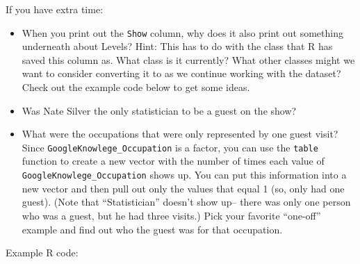 \documentclass[]{book}
\makeatletter
\newenvironment{Shaded}{\begin{snugshade}}{\end{snugshade}}
\newcommand{\KeywordTok}[1]{\textcolor[rgb]{0.13,0.29,0.53}{\textbf{{#1}}}}
\newcommand{\DataTypeTok}[1]{\textcolor[rgb]{0.13,0.29,0.53}{{#1}}}
\newcommand{\StringTok}[1]{\textcolor[rgb]{0.31,0.60,0.02}{{#1}}}
\newcommand{\CommentTok}[1]{\textcolor[rgb]{0.56,0.35,0.01}{\textit{{#1}}}}
\newcommand{\NormalTok}[1]{{#1}}
\providecommand{\tightlist}{%
  \setlength{\itemsep}{0pt}\setlength{\parskip}{0pt}}
\newenvironment{kframe}{%
\medskip{}
\setlength{\fboxsep}{.8em}
 \def\at@end@of@kframe{}%
 \ifinner\ifhmode%
  \def\at@end@of@kframe{\end{minipage}}%
  \begin{minipage}{\columnwidth}%
 \fi\fi%
 \def\FrameCommand##1{\hskip\@totalleftmargin \hskip-\fboxsep
 \colorbox{shadecolor}{##1}\hskip-\fboxsep
     \hskip-\linewidth \hskip-\@totalleftmargin \hskip\columnwidth}%
 \MakeFramed {\advance\hsize-\width
   \@totalleftmargin\z@ \linewidth\hsize
   \@setminipage}}%
 {\par\unskip\endMakeFramed%
 \at@end@of@kframe}
\renewenvironment{Shaded}{\begin{kframe}}{\end{kframe}}
\makeatother
\begin{document}
If you have extra time:

\begin{itemize}
\tightlist
\item
  When you print out the \texttt{Show} column, why does it also print
  out something underneath about Levels? Hint: This has to do with the
  class that R has saved this column as. What class is it currently?
  What other classes might we want to consider converting it to as we
  continue working with the dataset? Check out the example code below to
  get some ideas.
\item
  Was Nate Silver the only statistician to be a guest on the show?
\item
  What were the occupations that were only represented by one guest
  visit? Since \texttt{GoogleKnowlege\_Occupation} is a factor, you can
  use the \texttt{table} function to create a new vector with the number
  of times each value of \texttt{GoogleKnowlege\_Occupation} shows up.
  You can put this information into a new vector and then pull out only
  the values that equal 1 (so, only had one guest). (Note that
  ``Statistician'' doesn't show up-- there was only one person who was a
  guest, but he had three visits.) Pick your favorite ``one-off''
  example and find out who the guest was for that occupation.
\end{itemize}

Example R code:

\begin{Shaded}
\end{Shaded}

\begin{Shaded}
\end{Shaded}

\begin{Shaded}
\end{Shaded}
\end{document}
